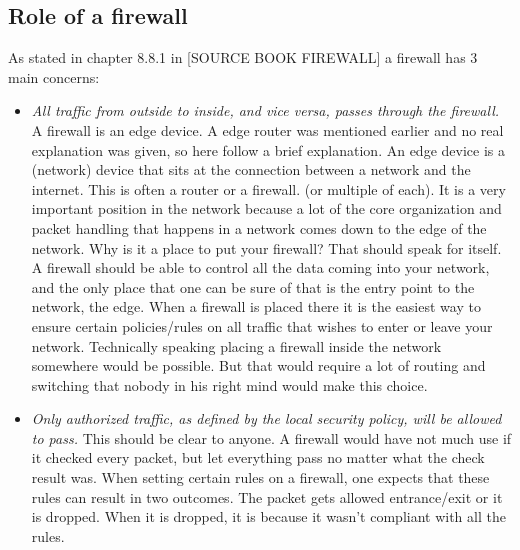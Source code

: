 \subsection{Role of a firewall}
As stated in chapter 8.8.1 in [SOURCE BOOK FIREWALL] a firewall has 3 main concerns:
\begin{itemize}
\item\textit{ All traffic from outside to inside, and vice versa, passes through the firewall.} A firewall is an edge device. A edge router was mentioned earlier and no real explanation was given, so here follow a brief explanation. An edge device is a (network) device that sits at the connection between a network and the internet. This is often a router or a firewall. (or multiple of each). It is a very important position in the network because a lot of the core organization and packet handling that happens in a network comes down to the edge of the network. Why is it a place to put your firewall? That should speak for itself. A firewall should be able to control all the data coming into your network, and the only place that one can be sure of that is the entry point to the network, the edge. When a firewall is placed there it is the easiest way to ensure certain policies/rules on all traffic that wishes to enter or leave your network. Technically speaking placing a firewall inside the network somewhere would be possible. But that would require a lot of routing and switching that nobody in his right mind would make this choice.
\item \textit{Only authorized traffic, as defined by the local security policy, will be allowed to pass.} This should be clear to anyone. A firewall would have not much use if it checked every packet, but let everything pass no matter what the check result was. When setting certain rules on a firewall, one expects that these rules can result in two outcomes. The packet gets allowed entrance/exit or it is dropped. When it is dropped, it is because it wasn't compliant with all the rules.

\end{itemize}
